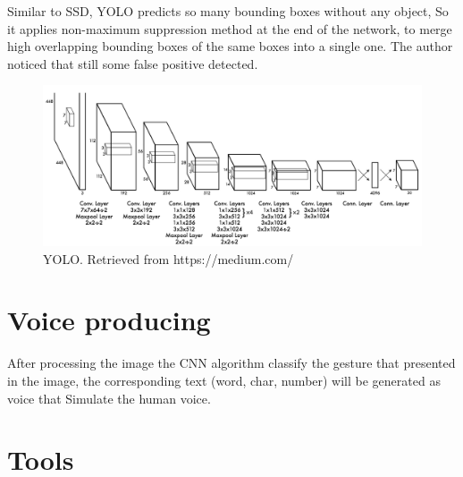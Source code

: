 \documentclass[12pt]{report}
\begin{document}
Similar to SSD, YOLO predicts so many bounding boxes without any object,
So it applies non-maximum suppression method at the end of the network,
to merge high overlapping bounding boxes of the same boxes into a single one.
The author noticed that still some false positive detected.\cite{Redmon2016}


\bigbreak
\bigbreak
\bigbreak


\begin{figure}[h]
    \centering
    \includegraphics[width=1\textwidth]{./images/yolo.png}
    \caption{YOLO. Retrieved from https://medium.com/}
    \label{fig:frcnn}
\end{figure} 


\newpage

\section{Voice producing}

After processing the image the CNN algorithm classify the gesture
that presented in the image, the corresponding text (word, char, number)
will be generated as voice that Simulate the human voice. 

\section{Tools}
\end{document}
